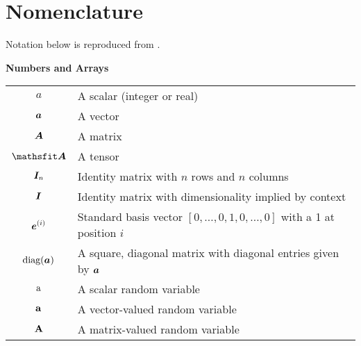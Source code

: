 \chapter{Nomenclature}
Notation below is reproduced from \citet{Goodfellow-et-al-2016}.


\vspace{\notationgap}
\begin{minipage}{\textwidth}
	\centerline{\bf Numbers and Arrays}
	\bgroup
	\def\arraystretch{1.5}
	\begin{tabular}{cp{3.25in}}
		$\displaystyle a$ & A scalar (integer or real)\\
		$\displaystyle {\bm{a}}$ & A vector\\
		$\displaystyle {\bm{A}}$ & A matrix\\
		$\displaystyle \tA$ & A tensor\\
		$\displaystyle {\bm{I}}_n$ & Identity matrix with $n$ rows and $n$ columns\\
		$\displaystyle {\bm{I}}$ & Identity matrix with dimensionality implied by context\\
		$\displaystyle {\bm{e}}^{(i)}$ & Standard basis vector $[0,\dots,0,1,0,\dots,0]$ with a 1 at position $i$\\
		$\displaystyle \text{diag}({\bm{a}})$ & A square, diagonal matrix with diagonal entries given by ${\bm{a}}$\\
		$\displaystyle {\textnormal{a}}$ & A scalar random variable\\
		$\displaystyle {\mathbf{a}}$ & A vector-valued random variable\\
		$\displaystyle {\mathbf{A}}$ & A matrix-valued random variable\\
	\end{tabular}
	\egroup
\end{minipage}

